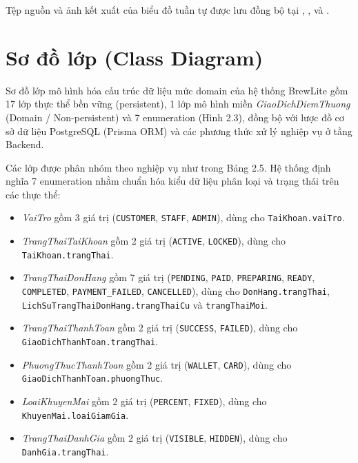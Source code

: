 \documentclass[12pt,a4paper]{report}
\begin{document}
Tệp nguồn và ảnh kết xuất của biểu đồ tuần tự được lưu đồng bộ tại , ,  và .

\section{Sơ đồ lớp (Class Diagram)}

Sơ đồ lớp mô hình hóa cấu trúc dữ liệu mức domain của hệ thống BrewLite gồm 17 lớp thực thể bền vững (persistent), 1 lớp mô hình miền \textit{GiaoDichDiemThuong} (\guillemotleft{}Domain / Non-persistent\guillemotright{}) và 7 enumeration (Hình 2.3), đồng bộ với lược đồ cơ sở dữ liệu PostgreSQL (Prisma ORM) và các phương thức xử lý nghiệp vụ ở tầng Backend.

Các lớp được phân nhóm theo nghiệp vụ như trong Bảng 2.5. Hệ thống định nghĩa 7 enumeration nhằm chuẩn hóa kiểu dữ liệu phân loại và trạng thái trên các thực thể:
\begin{itemize}[leftmargin=*,nosep]
  \item \textit{VaiTro} gồm 3 giá trị (\texttt{CUSTOMER}, \texttt{STAFF}, \texttt{ADMIN}), dùng cho \texttt{TaiKhoan.vaiTro}.
  \item \textit{TrangThaiTaiKhoan} gồm 2 giá trị (\texttt{ACTIVE}, \texttt{LOCKED}), dùng cho \texttt{TaiKhoan.trangThai}.
  \item \textit{TrangThaiDonHang} gồm 7 giá trị (\texttt{PENDING}, \texttt{PAID}, \texttt{PREPARING}, \texttt{READY}, \texttt{COMPLETED}, \texttt{PAYMENT\_FAILED}, \texttt{CANCELLED}), dùng cho \texttt{DonHang.trangThai}, \texttt{LichSuTrangThaiDonHang.trangThaiCu} và \texttt{trangThaiMoi}.
  \item \textit{TrangThaiThanhToan} gồm 2 giá trị (\texttt{SUCCESS}, \texttt{FAILED}), dùng cho \texttt{GiaoDichThanhToan.trangThai}.
  \item \textit{PhuongThucThanhToan} gồm 2 giá trị (\texttt{WALLET}, \texttt{CARD}), dùng cho \texttt{GiaoDichThanhToan.phuongThuc}.
  \item \textit{LoaiKhuyenMai} gồm 2 giá trị (\texttt{PERCENT}, \texttt{FIXED}), dùng cho \texttt{KhuyenMai.loaiGiamGia}.
  \item \textit{TrangThaiDanhGia} gồm 2 giá trị (\texttt{VISIBLE}, \texttt{HIDDEN}), dùng cho \texttt{DanhGia.trangThai}.
\end{itemize}
\end{document}
